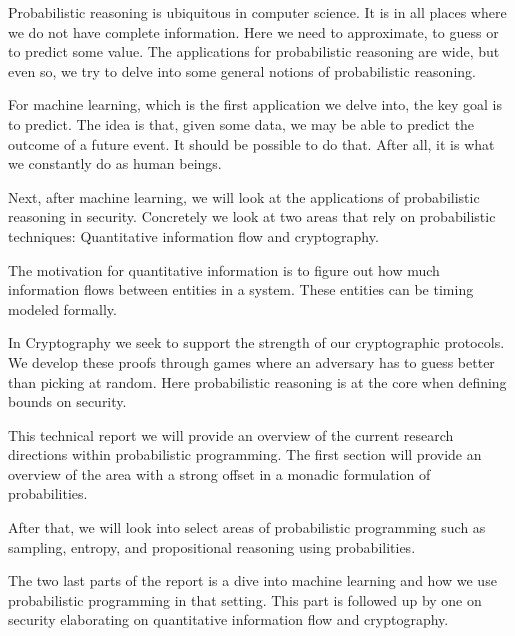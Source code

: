 
Probabilistic reasoning is ubiquitous in computer science. It is in
all places where we do not have complete information. Here we need to
approximate, to guess or to predict some value. The applications for
probabilistic reasoning are wide, but even so, we try to delve into
some general notions of probabilistic reasoning.

For machine learning, which is the first application we delve into,
the key goal is to predict. The idea is that, given
some data, we may be able to predict the outcome of a future event. 
It should be possible to do that. After all,
it is what we constantly do as human beings.

Next, after machine learning, we will look at the applications of
probabilistic reasoning in security. Concretely we look at two areas
that rely on probabilistic techniques: Quantitative information flow
and cryptography.

The motivation for quantitative information is to figure out how much
information flows between entities in a system. These entities can
be timing modeled formally.

In Cryptography we seek to support the strength of our cryptographic
protocols. We develop these proofs through games where an adversary has
to guess better than picking at random. Here probabilistic reasoning
is at the core when defining bounds on security.

This technical report we will provide an overview of the current
research directions within probabilistic programming. The first section
will provide an overview of the area with a strong offset in a monadic
formulation of probabilities.

After that, we will look into select areas of probabilistic programming such
as sampling, entropy, and propositional reasoning using probabilities.

The two last parts of the report is a dive into machine learning
and how we use probabilistic programming in that setting.
This part is followed up by one on security elaborating on quantitative
information flow and cryptography.